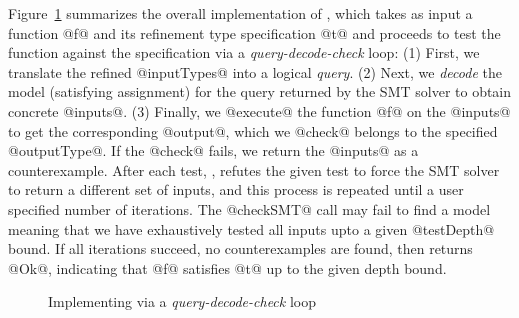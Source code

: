 Figure~\ref{fig:arch} summarizes the overall implementation of 
\toolname, which takes as input a function @f@ and its refinement 
type specification @t@ and proceeds to test the function against 
the specification via a \emph{query-decode-check} loop:
%
(1) First, we translate the refined @inputTypes@ into a logical \emph{query}.
%
(2) Next, we \emph{decode} the model (\ie satisfying assignment) for the 
    query returned by the SMT solver to obtain concrete @inputs@.
%
(3) Finally, we @execute@ the function @f@ on the @inputs@ to get the 
    corresponding @output@, which we @check@ belongs to the specified 
    @outputType@. If the @check@ fails, we return the @inputs@ as a counterexample.
%
After each test, \toolname, refutes the given test to force the SMT 
solver to return a different set of inputs, and this process is repeated until 
a user specified number of iterations. The @checkSMT@ call may fail
to find a model meaning that we have exhaustively tested all inputs upto
a given @testDepth@ bound. If all iterations succeed, \ie no counterexamples
are found, then \toolname returns @Ok@, indicating that @f@ satisfies @t@ 
up to the given depth bound.

\begin{figure}[ht!]
\begin{mdframed}
\begin{CenteredBox}
\end{CenteredBox}
\end{mdframed}
\caption{Implementing \toolname via a \emph{query-decode-check} loop}\label{fig:arch}
\end{figure}
